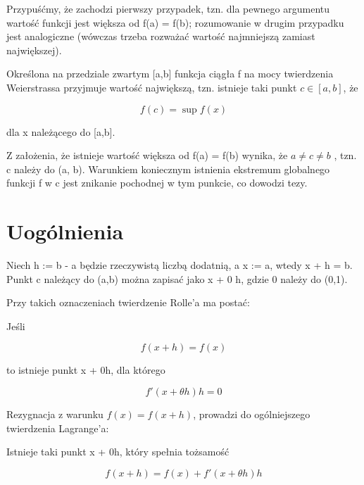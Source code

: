 \documentclass{article}
\begin{document}
Przypuśćmy, że zachodzi pierwszy przypadek, tzn. dla pewnego argumentu wartość funkcji jest większa od f(a) = f(b); rozumowanie w drugim przypadku jest analogiczne (wówczas trzeba rozważać wartość najmniejszą zamiast największej).

Określona na przedziale zwartym [a,b] funkcja ciągła f na mocy twierdzenia Weierstrassa przyjmuje wartość największą, tzn. istnieje taki punkt $c \in [a, b]$, że

\[f(c) = \sup f(x)\] 

dla x należącego do [a,b].

Z założenia, że istnieje wartość większa od f(a) = f(b) wynika, że $a \neq c \neq b$ , tzn. c należy do (a, b). Warunkiem koniecznym istnienia ekstremum globalnego funkcji f w c jest znikanie pochodnej w tym punkcie, co dowodzi tezy. 

\section*{Uogólnienia}
Niech h := b - a będzie rzeczywistą liczbą dodatnią, a x := a, wtedy x + h = b. Punkt c należący do (a,b) można zapisać jako x + 0 h, gdzie 0 należy do (0,1).

Przy takich oznaczeniach twierdzenie Rolle’a ma postać: 

Jeśli

\begin{equation*}
	 f(x+h)=f(x)
\end{equation*}

to istnieje punkt x + 0h, dla którego

\[f'(x+\theta h)h=0\]

Rezygnacja z warunku \(f(x)=f(x+h)\), prowadzi do ogólniejszego twierdzenia Lagrange’a:

Istnieje taki punkt x + 0h, który spełnia tożsamość

\begin{equation*}
	f(x + h) = f(x) + f'(x + \theta h) h
\end{equation*}
\end{document}
